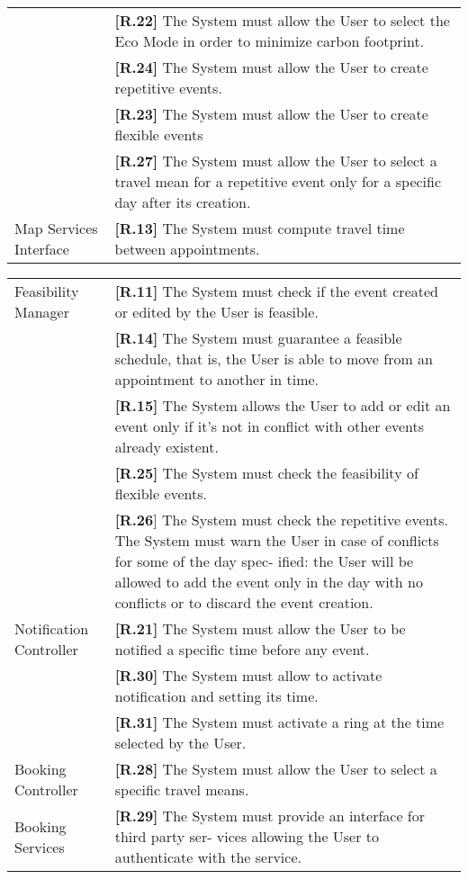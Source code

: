 \begin{table}[h!]
\begin{tabularx}{\textwidth}{@{}lX@{}}
		& \textbf{[R.22]} The System must allow the User to select the Eco Mode in order to minimize carbon footprint. \\
		& \textbf{[R.24]} The System must allow the User to create repetitive events. \\
		& \textbf{[R.23]} The System must allow the User to create flexible events \\
		& \textbf{[R.27]} The System must allow the User to select a travel mean for a repetitive event only for a specific day after its creation.\\
		Map Services Interface & \textbf{[R.13]} The System must compute travel time between appointments. \\
		\midrule
	\end{tabularx}
\end{table}

\newpage

\begin{table}[h!]
	\centering
	\footnotesize
	\begin{tabularx}{\textwidth}{@{}lX@{}}
		\midrule
		Feasibility Manager & \textbf{[R.11]} The System must check if the event created or edited by the User is feasible.\\
		& \textbf{[R.14]} The System must guarantee a feasible schedule, that is, the User is able to move from an appointment to another in time.\\
		& \textbf{[R.15]} The System allows the User to add or edit an event only if it’s not in conflict with other events already existent.\\
		& \textbf{[R.25]} The System must check the feasibility of flexible events.\\
		& \textbf{[R.26}] The System must check the repetitive events. The System must warn the User in case of conflicts for some of the day spec- ified: the User will be allowed to add the event only in the day with no conflicts or to discard the event creation. \\
		\midrule
		Notification Controller & \textbf{[R.21]} The System must allow the User to be notified a specific time before any event. \\
		& \textbf{[R.30]} The System must allow to activate notification and setting its time. \\
		& \textbf{[R.31]} The System must activate a ring at the time selected by the User. \\
		\midrule
		Booking Controller & \textbf{[R.28]} The System must allow the User to select a specific travel means.\\
		Booking Services & \textbf{[R.29]} The System must provide an interface for third party ser- vices allowing the User to authenticate with the service. \\
		\bottomrule
	\end{tabularx}
	
\end{table}


	